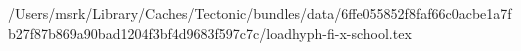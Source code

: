 /Users/msrk/Library/Caches/Tectonic/bundles/data/6ffe055852f8faf66c0acbe1a7fb27f87b869a90bad1204f3bf4d9683f597c7c/loadhyph-fi-x-school.tex